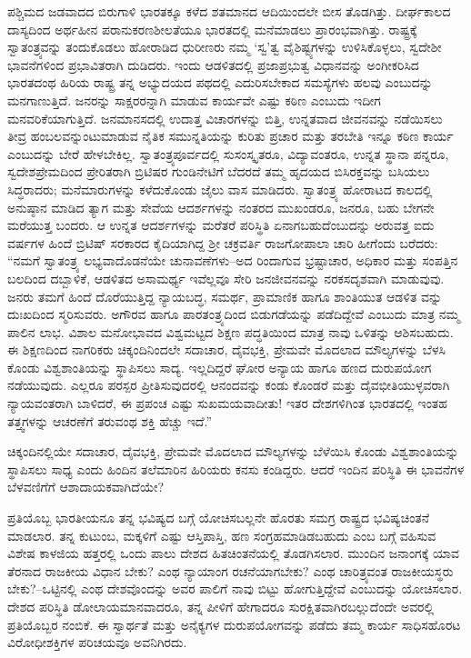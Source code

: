 ಪಶ್ಚಿಮದ ಜಡವಾದದ ಬಿರುಗಾಳಿ ಭಾರತಕ್ಕೂ ಕಳೆದ ಶತಮಾನದ ಆದಿಯಿಂದಲೇ ಬೀಸ ತೊಡಗಿತ್ತು. ದೀರ್ಘಕಾಲದ ದಾಸ್ಯದಿಂದ ಅರ್ಥಹೀನ ಪರಾನುಕರಣಶೀಲತೆಯೂ ಭಾರತದಲ್ಲಿ ಮನೆಮಾಡಲು ಪ್ರಾರಂಭವಾಗಿತ್ತು. ರಾಷ್ಟ್ರಕ್ಕೆ ಸ್ವಾತಂತ್ರ್ಯವನ್ನು ತಂದುಕೊಡಲು ಹೋರಾಡಿದ ಧುರೀಣರು ನಮ್ಮ ‘ಸ್ವ’ತ್ವ ವೈಶಿಷ್ಟ್ಯಗಳನ್ನು ಉಳಿಸಿಕೊಳ್ಳಲು, ಸ್ವದೇಶೀ ಭಾವನೆಗಳಿಂದ ಪ್ರಭಾವಿತ\-ರಾಗಿ ದುಡಿದರು. ಇಂದು ಆಡಳಿತದಲ್ಲಿ ಪ್ರಜಾಪ್ರಭುತ್ವ ವಿಧಾನವನ್ನು ಅಂಗೀಕರಿಸಿದ ಭಾರತದಂಥ ಹಿರಿಯ ರಾಷ್ಟ್ರ ತನ್ನ ಅಭ್ಯುದಯದ ಪಥದಲ್ಲಿ ಎದುರಿಸಬೇಕಾದ ಸಮಸ್ಯೆಗಳು ಹಲವು ಎಂಬುದನ್ನು ಮನಗಾಣುತ್ತಿದೆ. ಜನರನ್ನು ಸಾಕ್ಷರರನ್ನಾಗಿ ಮಾಡುವ ಕಾರ್ಯವೇ ಎಷ್ಟು ಕಠಿಣ ಎಂಬುದು ಇದೀಗ ಮನವರಿಕೆಯಾಗುತ್ತಿದೆ. ಜನಮಾನಸದಲ್ಲಿ ಉದಾತ್ತ ವಿಚಾರಗಳನ್ನು ಬಿತ್ತಿ, ಉನ್ನತವಾದ ಜೀವನವನ್ನು ನಡೆಯಿಸಲು ತೀವ್ರ ಹಂಬಲವನ್ನುಂಟುಮಾಡುವ ನೈತಿಕ ಸಮುನ್ನತಿಯನ್ನು ಕುರಿತು ಪ್ರಚಾರ ಮತ್ತು ತರಬೇತಿ ಇನ್ನೂ ಕಠಿಣ ಕಾರ್ಯ ಎಂಬುದನ್ನು ಬೇರೆ ಹೇಳಬೇಕಿಲ್ಲ. ಸ್ವಾತಂತ್ರ್ಯಪೂರ್ವದಲ್ಲಿ ಸುಸಂಸ್ಕೃತರೂ, ವಿದ್ಯಾವಂತರೂ, ಉನ್ನತ ಸ್ಥಾನಾ ಪನ್ನರೂ, ಸ್ವದೇಶಪ್ರೇಮದಿಂದ ಪ್ರೇರಿತರಾಗಿ ಬ್ರಿಟಿಷರ ಗುಂಡಿನೇಟಿಗೆ ಬೆದರದೆ ತಮ್ಮ ಹೃದಯದ ಬಿಸಿರಕ್ತವನ್ನು ಬಸಿಯಲು ಸಿದ್ಧರಾದರು; ಮನೆಮಾರುಗಳನ್ನು ಕಳೆದುಕೊಂಡು ಜೈಲು ವಾಸ ಮಾಡಿದರು. ಸ್ವಾತಂತ್ರ್ಯ ಹೋರಾಟದ ಕಾಲದಲ್ಲಿ ಅನುಷ್ಠಾನ ಮಾಡಿದ ತ್ಯಾಗ ಮತ್ತು ಸೇವೆಯ ಆದರ್ಶಗಳನ್ನು ನಂತರದ ಮುಖಂಡರೂ, ಜನರೂ, ಬಹು ಬೇಗನೇ ಮರೆಯುತ್ತ ಬಂದರು. ಆ ಉನ್ನತ ಆದರ್ಶಗಳನ್ನು ಮರೆತರೆ ಪರಿಸ್ಥಿತಿ ಏನಾಗಬಹುದೆಂಬುದನ್ನು ಅರುವತ್ತ ಐದು ವರ್ಷಗಳ ಹಿಂದೆ ಬ್ರಿಟಿಷ್ ಸರಕಾರದ ಕೈದಿಯಾಗಿದ್ದ ಶ‍್ರೀ ಚಕ್ರವರ್ತಿ ರಾಜಗೋಪಾಲಾ ಚಾರಿ ಹೀಗೆಂದು ಬರೆದರು: “ನಮಗೆ ಸ್ವಾತಂತ್ರ್ಯ ಲಭ್ಯವಾದೊಡನೆಯೇ ಚುನಾವಣೆಗಳು–ಅದ ರಿಂದಾಗುವ ಭ್ರಷ್ಟಾಚಾರ, ಅಧಿಕಾರ ಮತ್ತು ಸಂಪತ್ತಿನ ಬಲದಿಂದ ದಬ್ಬಾಳಿಕೆ, ಆಡಳಿತದ ಅಸಾಮರ್ಥ್ಯ ಇವೆಲ್ಲವೂ ಸೇರಿ ಜನಜೀವನವನ್ನು ನರಕಸದೃಶವಾಗಿ ಮಾಡುವುವು. ಜನರು ತಮಗೆ ಹಿಂದೆ ದೊರೆಯುತ್ತಿದ್ದ ನ್ಯಾಯಬದ್ಧ, ಸಮರ್ಥ, ಪ್ರಾಮಾಣಿಕ ಹಾಗೂ ಶಾಂತಿಯುತ ಆಡಳಿತ ವನ್ನು ದುಃಖದಿಂದ ಸ್ಮರಿಸುವರು. ಅಗೌರವ ಹಾಗೂ ಪಾರತಂತ್ರ್ಯದಿಂದ ಬಿಡುಗಡೆಯನ್ನು ಪಡೆದಿದ್ದೇವೆ ಎಂಬುದು ಮಾತ್ರ ನಮ್ಮ ಪಾಲಿನ ಲಾಭ. ವಿಶಾಲ ಮನೋಭಾವದ ವಿಶ್ವಮಟ್ಟದ ಶಿಕ್ಷಣ ಪದ್ಧತಿಯಿಂದ ಮಾತ್ರ ನಾವು ಒಳಿತನ್ನು ಆಶಿಸಬಹುದು. ಈ ಶಿಕ್ಷಣದಿಂದ ನಾಗರಿಕರು ಚಿಕ್ಕಂದಿನಿಂದಲೇ ಸದಾಚಾರ, ದೈವಭಕ್ತಿ, ಪ್ರೇಮವೇ ಮೊದಲಾದ ಮೌಲ್ಯಗಳನ್ನು ಬೆಳಸಿ ಕೊಂಡು ವಿಶ್ವಶಾಂತಿಯನ್ನು ಸ್ಥಾಪಿಸಲು ಸಾದ್ಯ. ಇಲ್ಲದಿದ್ದರೆ ಘೋರ ಅನ್ಯಾಯ ಹಾಗೂ ಹಣದ ದುರುಪಯೋಗ ನಡೆಯುವುದು. ಎಲ್ಲರೂ ಪರಸ್ಪರ ಪ್ರೀತಿಸುವುದರಲ್ಲಿ ಆನಂದವನ್ನು ಕಂಡು ಕೊಂಡರೆ ಮತ್ತು ದೈವಭೀತಿಯುಳ್ಳವರಾಗಿ ನ್ಯಾಯವಂತರಾಗಿ ಬಾಳಿದರೆ, ಈ ಪ್ರಪಂಚ ಎಷ್ಟು ಸುಖಮಯವಾದೀತು! ಇತರ ದೇಶಗಳಿಗಿಂತ ಭಾರತದಲ್ಲಿ ಇಂತಹ ತತ್ತ್ವಗಳನ್ನು ಆಚರಣೆಗೆ ತರುವಂಥ ಶಕ್ತಿ ಹೆಚ್ಚು ಇದೆ.”

ಚಿಕ್ಕಂದಿನಲ್ಲಿಯೇ ಸದಾಚಾರ, ದೈವಭಕ್ತಿ, ಪ್ರೇಮವೇ ಮೊದಲಾದ ಮೌಲ್ಯಗಳನ್ನು ಬೆಳೆಯಿಸಿ ಕೊಂಡು ವಿಶ್ವಶಾಂತಿಯನ್ನು ಸ್ಥಾಪಿಸಲು ಸಾಧ್ಯ ಎಂದು ಹಿಂದಿನ ತಲೆಮಾರಿನ ಹಿರಿಯರು ಕನಸು ಕಂಡಿದ್ದರು. ಆದರೆ ಇಂದಿನ ಪರಿಸ್ಥಿತಿ ಈ ಭಾವನೆಗಳ ಬೆಳವಣಿಗೆಗೆ ಆಶಾದಾಯಕವಾಗಿದೆಯೇ?

ಪ್ರತಿಯೊಬ್ಬ ಭಾರತೀಯನೂ ತನ್ನ ಭವಿಷ್ಯದ ಬಗ್ಗೆ ಯೋಚಿಸಬಲ್ಲನೇ ಹೊರತು ಸಮಗ್ರ ರಾಷ್ಟ್ರದ ಭವಿಷ್ಯಚಿಂತನೆ ಮಾಡಲಾರ. ತನ್ನ ಕುಟುಂಬ, ಮಕ್ಕಳಿಗೆ ಎಷ್ಟು ಆಸ್ತಿಪಾಸ್ತಿ, ಹಣ ಸಂಗ್ರಹಮಾಡಿಡಬಹುದು ಎಂಬ ಬಗ್ಗೆ ವಹಿಸುವ ವಿಶೇಷ ಕಾಳಜಿಯ ಹತ್ತರಲ್ಲಿ ಒಂದು ಪಾಲು ದೇಶದ ಹಿತಚಿಂತನೆಯಲ್ಲಿ ತೊಡಗಿಸಲಾರ. ಮುಂದಿನ ಜನಾಂಗಕ್ಕೆ ಯಾವ ತೆರನಾದ ರಾಜಕೀಯ ವಿಧಾನ ಬೇಕು? ಎಂಥ ನ್ಯಾಯಾಂಗ ರಚನೆಯಾಗಬೇಕು? ಎಂಥ ಚಾರಿತ್ರ್ಯವಂತ ರಾಜಕೀಯಸ್ಥರು ಬೇಕು?–ಒಟ್ಟಿನಲ್ಲಿ ಎಂಥ ದೇಶವೊಂದನ್ನು ಅವರ ಪಾಲಿಗೆ ನಾವು ಬಿಟ್ಟು ಹೋಗುತ್ತಿದ್ದೇವೆ ಎಂಬುದನ್ನು ಯೋಚಿಸಲಾರ. ದೇಶದ ಪರಿಸ್ಥಿತಿ ಡೋಲಾಯಮಾನವಾದರೂ, ತನ್ನ ಪೀಳಿಗೆ ಹೇಗಾದರೂ ಸುರಕ್ಷಿತವಾಗಿರಬಲ್ಲುದೆಂದೇ ಅವರಲ್ಲಿ ಪ್ರತಿಯೊಬ್ಬರ ನಂಬಿಕೆ. ಈ ಸ್ವಾರ್ಥತೆ ಮತ್ತು ಅನೈಕ್ಯಗಳ ದುರುಪಯೋಗವನ್ನು ಪಡೆದು ತಮ್ಮ ಕಾರ್ಯ ಸಾಧಿಸಹೊರಟ ವಿರೋಧೀಶಕ್ತಿಗಳ ಪರಿಚಯವೂ ಅವನಿಗಿರದು.

